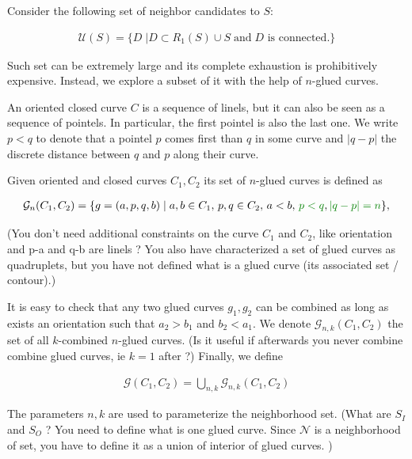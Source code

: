 \documentclass[runningheads]{llncs}
\newcommand{\jaco}[1]{{\textcolor{green!50!black}{#1}}}
\begin{document}
Consider the \jaco{following set of neighbor candidates to $S$:}

\begin{align*}
\mathcal{U}(S) = \{ D \; | D \subset R_1(S) \cup S \; \text{and} \; \text{$D$ is connected}. \}
\end{align*}


Such set can be extremely large and its complete exhaustion is prohibitively expensive.  Instead, we explore a subset of it with the help of $n$-glued curves.

An oriented closed curve $C$ is a sequence of linels, but it can also be seen as a sequence of pointels. In particular, the first pointel is also the last one. We write $p < q$ to denote that a pointel $p$ comes first than $q$ in some curve \jaco{and $|q-p|$ the discrete distance between $q$ and $p$ along their curve.}


\begin{definition}
Given oriented and closed curves $C_1,C_2$ its set of $n$-glued curves is defined as

\begin{align*}
	\mathcal{G}_n(C_1,C_2) = \{ g=(a,p,q,b) \; | \; a,b \in C_1, \, p,q \in C_2, \, a<b, \, \jaco{p<q}, \jaco{|q-p|=n} \},
\end{align*}

\jaco{(You don't need additional constraints on the curve $C_1$ and $C_2$, like orientation and p-a and q-b are linels ? You also have characterized a set of glued curves as quadruplets, but you have not defined what is a glued curve (its associated set / contour).)}
\end{definition}

It is easy to check that any two glued curves $g_1,g_2$ can be combined as long as exists an orientation such that $a_2 > b_1$ and $b_2 < a_1$. We denote $\mathcal{G}_{n,k}(C_1,C_2)$  the set of all $k$-combined $n$-glued curves. \jaco{(Is it useful if afterwards you never combine combine glued curves, ie $k=1$ after ?)} Finally, we define

\begin{align*}
	\mathcal{G}(C_1,C_2) = \bigcup_{n,k}{\mathcal{G}_{n,k}(C_1,C_2) }
\end{align*}


The parameters $n,k$ are used to parameterize the neighborhood set. \jaco{(What are $S_I$ and $S_O$ ? You need to define what is one glued curve. Since $\mathcal{N}$ is a neighborhood of set, you have to define it as a union of interior of glued curves. ) }
\end{document}
